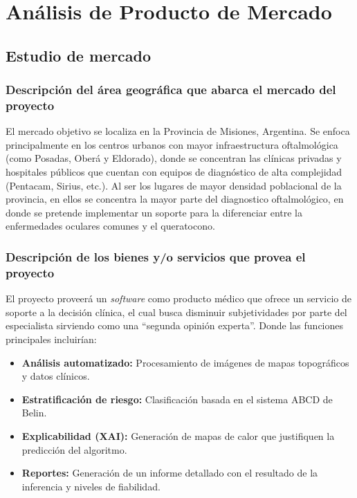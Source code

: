 \newpage
{}
\chapter{Análisis de Producto de Mercado}
\section{Estudio de mercado}

    \subsection{Descripción del área geográfica que abarca el mercado del proyecto}
    
        El mercado objetivo se localiza en la Provincia de Misiones, Argentina. Se enfoca principalmente en los centros urbanos con mayor infraestructura oftalmológica (como Posadas, Oberá y Eldorado), donde se concentran las clínicas privadas y hospitales públicos que cuentan con equipos de diagnóstico de alta complejidad (Pentacam, Sirius, etc.). Al ser los lugares de mayor densidad poblacional de la provincia, en ellos se concentra la mayor parte del diagnostico oftalmológico, en donde se pretende implementar un soporte para la diferenciar entre la enfermedades oculares comunes y el queratocono. 

    \subsection{Descripción de los bienes y/o servicios que provea el proyecto}
    
        El proyecto proveerá un \textit{software} como producto médico que ofrece un servicio de soporte a la decisión clínica, el cual busca disminuir subjetividades por parte del especialista sirviendo como una ``segunda opinión experta''. Donde las funciones principales incluirían:
        
        \begin{itemize}[leftmargin=*]
            \item \textbf{Análisis automatizado:} Procesamiento de imágenes de mapas topográficos y datos clínicos.
            
            \item \textbf{Estratificación de riesgo:} Clasificación basada en el sistema ABCD de Belin.
            
            \item \textbf{Explicabilidad (XAI):} Generación de mapas de calor que justifiquen la predicción del algoritmo.
            
            \item \textbf{Reportes:} Generación de un informe detallado con el resultado de la inferencia y niveles de fiabilidad.
        \end{itemize}

